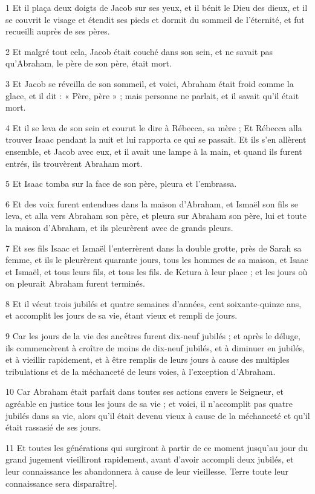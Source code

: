 \par 1 Et il plaça deux doigts de Jacob sur ses yeux, et il bénit le Dieu des dieux, et il se couvrit le visage et étendit ses pieds et dormit du sommeil de l'éternité, et fut recueilli auprès de ses pères.
\par 2 Et malgré tout cela, Jacob était couché dans son sein, et ne savait pas qu'Abraham, le père de son père, était mort.
\par 3 Et Jacob se réveilla de son sommeil, et voici, Abraham était froid comme la glace, et il dit : « Père, père » ; mais personne ne parlait, et il savait qu'il était mort.
\par 4 Et il se leva de son sein et courut le dire à Rébecca, sa mère ; Et Rébecca alla trouver Isaac pendant la nuit et lui rapporta ce qui se passait. Et ils s'en allèrent ensemble, et Jacob avec eux, et il avait une lampe à la main, et quand ils furent entrés, ils trouvèrent Abraham mort.
\par 5 Et Isaac tomba sur la face de son père, pleura et l'embrassa.
\par 6 Et des voix furent entendues dans la maison d'Abraham, et Ismaël son fils se leva, et alla vers Abraham son père, et pleura sur Abraham son père, lui et toute la maison d'Abraham, et ils pleurèrent avec de grands pleurs.
\par 7 Et ses fils Isaac et Ismaël l'enterrèrent dans la double grotte, près de Sarah sa femme, et ils le pleurèrent quarante jours, tous les hommes de sa maison, et Isaac et Ismaël, et tous leurs fils, et tous les fils. de Ketura à leur place ; et les jours où on pleurait Abraham furent terminés.
\par 8 Et il vécut trois jubilés et quatre semaines d'années, cent soixante-quinze ans, et accomplit les jours de sa vie, étant vieux et rempli de jours.
\par 9 Car les jours de la vie des ancêtres furent dix-neuf jubilés ; et après le déluge, ils commencèrent à croître de moins de dix-neuf jubilés, et à diminuer en jubilés, et à vieillir rapidement, et à être remplis de leurs jours à cause des multiples tribulations et de la méchanceté de leurs voies, à l'exception d'Abraham.
\par 10 Car Abraham était parfait dans toutes ses actions envers le Seigneur, et agréable en justice tous les jours de sa vie ; et voici, il n'accomplit pas quatre jubilés dans sa vie, alors qu'il était devenu vieux à cause de la méchanceté et qu'il était rassasié de ses jours.
\par 11 Et toutes les générations qui surgiront à partir de ce moment jusqu'au jour du grand jugement vieilliront rapidement, avant d'avoir accompli deux jubilés, et leur connaissance les abandonnera à cause de leur vieillesse. Terre toute leur connaissance sera disparaître].
